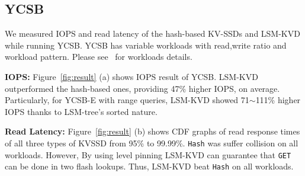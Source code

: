 \documentclass{abstract_hutech}
\newcommand{\ours}{LSM-KVD}
\begin{document}
\vspace{-10pt}
\subsection{YCSB}\vspace{-5pt}
We measured IOPS and read latency of the hash-based KV-SSDs and \ours{} while running YCSB.
YCSB has variable workloads with read,write ratio and workload pattern. Please see~\cite{YCSB} for workloads details.


\textbf{IOPS:}
Figure~\ref{fig:result} (a) shows IOPS result of YCSB.
\ours{} outperformed the
hash-based ones, providing 47\% higher IOPS, on average. Particularly, for
YCSB-E with range queries, \ours{} showed 71$\sim$111\% higher IOPS thanks to
LSM-tree's sorted nature. 

%
\textbf{Read Latency:}
Figure~\ref{fig:result} (b) shows CDF graphs of read response times of all three types of KVSSD from 95\% to 99.99\%.
\texttt{Hash} was suffer collision on all workloads. 
However, By using level pinning \ours{} can guarantee that \texttt{GET} can be done in two flash lookups.
Thus, \ours{} beat \texttt{Hash} on all workloads.
\vspace{-5pt}


\end{document}
